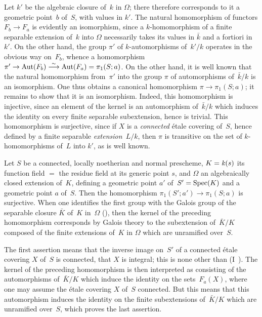 Let $k'$ be the algebraic closure of~$k$ in $\Omega$; there
therefore corresponds to it a geometric point~$b$ of~$S$, with
values in $k'$. The natural homomorphism of functors $F_b\to F_a$
is evidently an isomorphism, since a $k$-homomorphism of a
finite separable extension of~$k$ into $\Omega$
necessarily takes its values in $\bar{k}$ and a fortiori in
$k'$. On the other hand, the group $\pi'$ of $k$-automorphisms of~$k'/k$
operates in the obvious way on~$F_b$, whence a
homomorphism $\pi'\to \Aut(F_b)\isomto \Aut(F_a)=\pi_1(S;a)$.
On the other hand, it is well known that the natural homomorphism from~$\pi'$
into the group $\pi$ of automorphisms of~$\bar{k}/k$ is an
isomorphism. One thus obtains a canonical homomorphism $\pi\to
\pi_1(S;a)$; it remains to show that it is an isomorphism. Indeed,
this homomorphism is injective, since an element of the kernel is an
automorphism of~$\bar{k}/k$ which induces the identity on every
finite separable subextension, hence is trivial. This
homomorphism is surjective, since if $X$ is a \emph{connected}
\'etale covering of~$S$, hence defined by a finite separable
\emph{extension}~$L/k$, then $\pi$ is transitive
on the set of $k$-homomorphisms of~$L$ into $k'$, as is well
known.

\begin{proposition}
\label{V.8.2}
Let $S$ be a connected, locally noetherian and
normal prescheme, $K=\mathit{k}(s)$ its function field $=$ the residue field at
its generic point $s$, and $\Omega$ an
algebraically closed extension of~$K$, defining a geometric
point $a'$ of~$S'=\operatorname{Spec}(K)$ and a geometric
point $a$ of~$S$. Then the homomorphism
$\pi_1(S';a')\to\pi_1(S;a)$ is surjective. When one identifies the
first group with the Galois group of the separable closure
$\bar{K}$ of~$K$ in~$\Omega$ (\cf {}), then the kernel of
the preceding homomorphism corresponds by Galois theory
to the subextension of~$\bar{K}/K$ composed of the
finite extensions of~$K$ in $\Omega$ which are unramified over~$S$.
\end{proposition}

The first assertion means that the inverse image on~$S'$ of a
connected \'etale covering $X$ of~$S$ is connected, \ie that $X$
is integral; this is none other than (I~). The kernel of
the preceding homomorphism is then interpreted as
consisting of the automorphisms of~$\bar{K}/K$ which induce
the identity on the sets~$F_a(X)$,
where one may assume the \'etale covering $X$ of~$S$
connected. But this means that this automorphism induces
the identity on the finite subextensions of~$\bar{K}/K$ which are
unramified over~$S$, which proves the last assertion.

